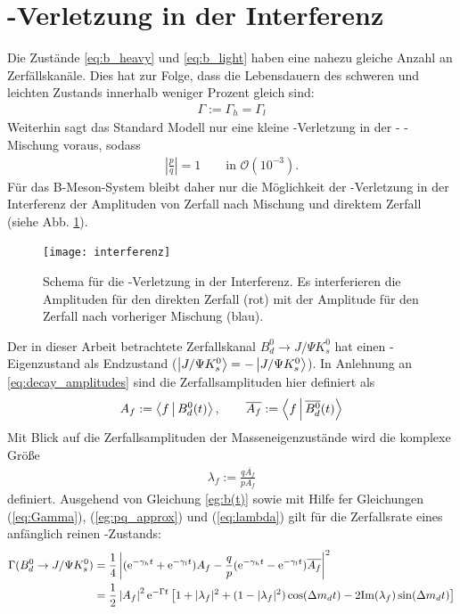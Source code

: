 \section{\CP-Verletzung in der Interferenz}
Die Zustände \ref{eq:b_heavy} und \ref{eq:b_light} haben eine nahezu gleiche Anzahl an Zerfällskanäle. Dies hat zur Folge, dass die Lebensdauern des schweren und leichten Zustands innerhalb weniger Prozent gleich sind:
\begin{align}
\Gamma := \Gamma_h = \Gamma_l \label{eq:Gamma}
\end{align}
Weiterhin sagt das Standard Modell nur eine kleine \CP-Verletzung in der \Bd - \Bdbar - Mischung voraus, sodass
\begin{align}
\left|\frac{p}{q}\right| = 1 \qquad \text{in } \mathcal{O}(10^{-3}). \label{eg:pq_approx}
\end{align}
Für das B-Meson-System bleibt daher nur die Möglichkeit der \CP-Verletzung in der Interferenz der Amplituden von Zerfall nach Mischung und direktem Zerfall (siehe Abb. \ref{fig:interferenz}). 
\begin{figure}[hptb]
\centering
\texttt{[image: interferenz]}
\caption{Schema für die \CP-Verletzung in der Interferenz. Es interferieren die Amplituden für den direkten Zerfall (rot) mit der Amplitude für den Zerfall nach vorheriger Mischung (blau).}
\label{fig:interferenz}
\end{figure}
Der in dieser Arbeit betrachtete Zerfallskanal $B_d^0 \rightarrow J/\Psi K_s^0$ hat einen \CP-Eigenzustand als Endzustand (\CP $\Ket{J/\Psi K_s^0} = -\Ket{J/\Psi K_s^0}$). In Anlehnung an \ref{eq:decay_amplitudes} sind die Zerfallsamplituden hier definiert als
\begin{align}
\nonumber A_f := \Braket{f|\text{$B_d^0$}(t)}, \qquad \overline{A_{f}} := \Braket{f|\text{$\overline{B_d^0}$}(t)}
\end{align}
Mit Blick auf die Zerfallsamplituden der Masseneigenzustände wird die komplexe Größe
\begin{align}
\lambda_f := \frac{q\overline{A_f}}{pA_f} \label{eq:lambda}
\end{align}
definiert. Ausgehend von Gleichung \ref{eg:b(t)} sowie mit Hilfe fer Gleichungen (\ref{eq:Gamma}), (\ref{eg:pq_approx}) und (\ref{eq:lambda}) gilt für die Zerfallsrate eines anfänglich reinen \Bd-Zustands:
\begin{align}
\nonumber \Gamma (\text{$B_d^0$} \rightarrow J/\Psi K_s^0) &= \frac{1}{4}\left| (\mathrm{e}^{-\gamma_h t}+\mathrm{e}^{-\gamma_l t})A_f - \frac{q}{p}(\mathrm{e}^{-\gamma_h t}-\mathrm{e}^{-\gamma_l t})\overline{A_f}\right|^2 \\
&= \frac{1}{2} \left|A_f\right|^2\mathrm{e}^{-\Gamma t} \left[1+|\lambda_f|^2 + (1-|\lambda_f|^2)\cos(\Delta m_d t) - 2\mathrm{Im}(\lambda_f)\sin(\Delta m_d t)\right] \label{eq:bd}
\end{align}

